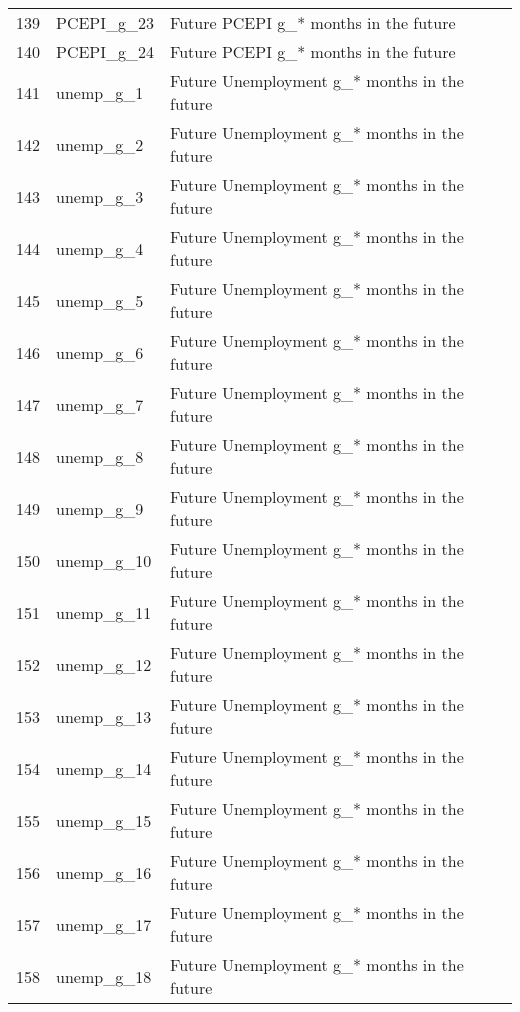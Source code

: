 \begin{tabular}{lll}
139 &                 PCEPI\_g\_23 &              Future PCEPI g\_* months in the future \\
140 &                 PCEPI\_g\_24 &              Future PCEPI g\_* months in the future \\
141 &                  unemp\_g\_1 &       Future Unemployment g\_* months in the future \\
142 &                  unemp\_g\_2 &       Future Unemployment g\_* months in the future \\
143 &                  unemp\_g\_3 &       Future Unemployment g\_* months in the future \\
144 &                  unemp\_g\_4 &       Future Unemployment g\_* months in the future \\
145 &                  unemp\_g\_5 &       Future Unemployment g\_* months in the future \\
146 &                  unemp\_g\_6 &       Future Unemployment g\_* months in the future \\
147 &                  unemp\_g\_7 &       Future Unemployment g\_* months in the future \\
148 &                  unemp\_g\_8 &       Future Unemployment g\_* months in the future \\
149 &                  unemp\_g\_9 &       Future Unemployment g\_* months in the future \\
150 &                 unemp\_g\_10 &       Future Unemployment g\_* months in the future \\
151 &                 unemp\_g\_11 &       Future Unemployment g\_* months in the future \\
152 &                 unemp\_g\_12 &       Future Unemployment g\_* months in the future \\
153 &                 unemp\_g\_13 &       Future Unemployment g\_* months in the future \\
154 &                 unemp\_g\_14 &       Future Unemployment g\_* months in the future \\
155 &                 unemp\_g\_15 &       Future Unemployment g\_* months in the future \\
156 &                 unemp\_g\_16 &       Future Unemployment g\_* months in the future \\
157 &                 unemp\_g\_17 &       Future Unemployment g\_* months in the future \\
158 &                 unemp\_g\_18 &       Future Unemployment g\_* months in the future \\

\end{tabular}
